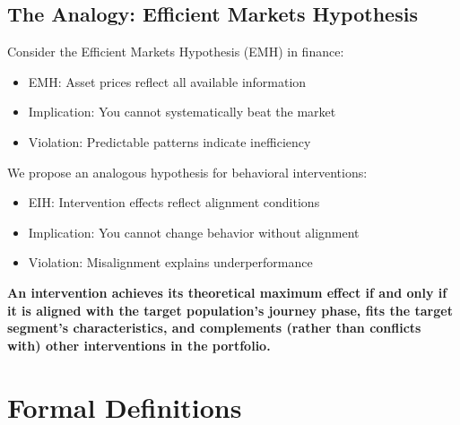 \subsection{The Analogy: Efficient Markets Hypothesis}

Consider the Efficient Markets Hypothesis (EMH) in finance:
\begin{itemize}
\item EMH: Asset prices reflect all available information
\item Implication: You cannot systematically beat the market
\item Violation: Predictable patterns indicate inefficiency
\end{itemize}

We propose an analogous hypothesis for behavioral interventions:
\begin{itemize}
\item EIH: Intervention effects reflect alignment conditions
\item Implication: You cannot change behavior without alignment
\item Violation: Misalignment explains underperformance
\end{itemize}

\begin{tcolorbox}[colback=yellow!5!white, colframe=yellow!75!black,
    title=The Efficient Intervention Hypothesis (Informal)]
\textbf{An intervention achieves its theoretical maximum effect if and only if
it is aligned with the target population's journey phase, fits the target segment's
characteristics, and complements (rather than conflicts with) other interventions
in the portfolio.}
\end{tcolorbox}


\section{Formal Definitions}
\label{sec:eih-definitions}

